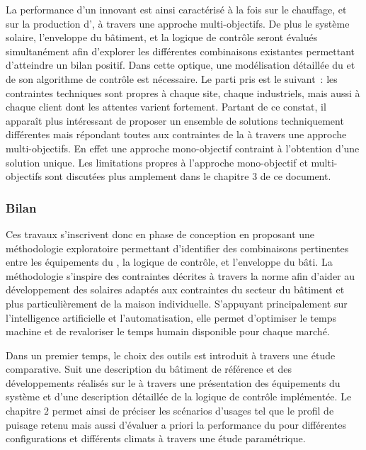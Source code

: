 La performance d’un  innovant est ainsi caractérisé à la
fois sur le chauffage, et sur la production d’, à travers une approche
multi-objectifs. De plus le système solaire, l’enveloppe du bâtiment, et la logique de contrôle
seront évalués simultanément afin d’explorer les différentes combinaisons existantes
permettant d’atteindre un bilan positif.
Dans cette optique, une modélisation détaillée du  et de son algorithme de
contrôle est nécessaire. Le parti pris est le suivant~: les contraintes techniques sont
propres à chaque site, chaque industriels, mais aussi à chaque client dont les attentes
varient fortement. Partant de ce constat, il apparaît plus intéressant de proposer
un ensemble de solutions techniquement différentes mais répondant toutes aux contraintes
de la  à travers une approche multi-objectifs. En effet une approche mono-objectif
contraint à l’obtention d’une solution unique. Les limitations propres à l’approche
mono-objectif et multi-objectifs sont discutées plus amplement dans le chapitre $3$ de ce
document.


\subsubsection{Bilan} %
\label{ssub:bilan_methode}
Ces travaux s’inscrivent donc en phase de conception en proposant une méthodologie
exploratoire permettant d’identifier des combinaisons pertinentes entre les équipements du
, la logique de contrôle, et l’enveloppe du bâti. La méthodologie s’inspire des
contraintes décrites à travers la norme  afin d’aider au développement
des  solaires adaptés aux contraintes du secteur du bâtiment et plus
particulièrement de la maison individuelle. S’appuyant principalement sur
l’intelligence artificielle et l’automatisation, elle permet d’optimiser le temps machine
et de revaloriser le temps humain disponible pour chaque marché.

Dans un premier temps, le choix des outils est introduit à travers une étude comparative.
Suit une description du bâtiment de référence et des développements réalisés sur le
 à travers une présentation des équipements du système et d’une description détaillée
de la logique de contrôle implémentée. Le chapitre $2$ permet ainsi de préciser
les scénarios d’usages tel que le profil de puisage retenu mais aussi d’évaluer
a priori la performance du  pour différentes configurations et différents climats
à travers une étude paramétrique.

